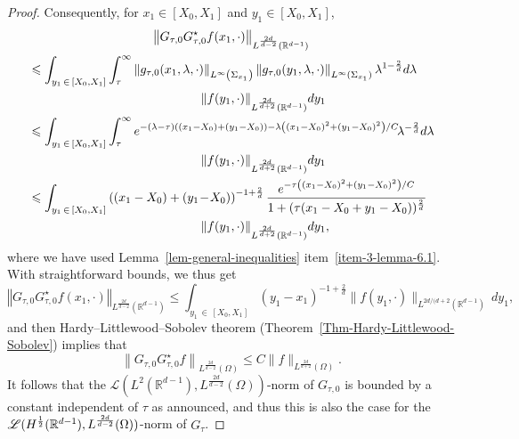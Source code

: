 \documentclass[AHL,Unicode,longabstracts]{cedram}
\newcommand{\scL}{\mathscr{L}}
\newcommand*\R{\mathbb{R}}
\newcommand{\norm}[1]{\left\Vert#1\right\Vert}
\renewcommand{\leq}{\leqslant}
\begin{document}
\begin{proof}
Consequently, for $x_1 \in [X_0, X_1]$ and $y_1 \in [X_0, X_1]$,
\begin{multline*}
\norm{G_{\tau,0} G_{\tau,0}^\star f(x_1, \cdot)
}_{L^{\frac{2d}{d-2}}\left(\R^{d-1}\right)}
\\
\begin{aligned}
&\leq
\int_{y_1\, \in\,[X_0, X_1]} \int_\tau^\infty \norm{ g_{\tau,0}(x_1,\lambda, \cdot)}_{L^\infty\left(\Sigma_{x_1}\right)} \norm{g_{\tau,0}(y_1,\lambda, \cdot)}_{L^\infty(\Sigma_{x_1})} \lambda^{1 - \frac{2}{d}} d \lambda\\
& \mkern250mu  \| f(y_1, \cdot) \|_{L^{\frac{2d}{d+2}}\left(\R^{d-1}\right)} dy_1
\\
& \leq
\int_{y_1\,\in\,[X_0, X_1]} 
\int_\tau^\infty  e^{-(\lambda - \tau)\left((x_1 - X_0)+(y_1-X_0)\right) - \lambda \left((x_1 - X_0)^2+(y_1-X_0)^2\right)/C}\!\lambda^{ - \frac{2}{d}} d \lambda \\
&\mkern250mu \| f(y_1, \cdot) \|_{L^{\frac{2d}{d+2}}\left(\R^{d-1}\right)}  dy_1
\\
& \leq 
\int_{y_1\, \in\,[X_0, X_1]}\left((x_1 -X_0) + (y_1\! -\!X_0) \right)^{-1+\frac{2}{d}} \frac{e^{-\tau \left((x_1 - X_0)^2+(y_1-X_0)^2\right)/C}}{1 + (\tau (x_1 -X_0 + y_1 -X_0))^{\frac{2}{d}}}\\
&\mkern250mu \| f(y_1, \cdot) \|_{L^{\frac{2d}{d+2}}\left(\R^{d-1}\right)} dy_1,
\end{aligned}
\end{multline*}
where we have used Lemma~\ref{lem-general-inequalities} item~\eqref{item-3-lemma-6.1}. With straightforward bounds, we thus get
\[
\norm{G_{\tau,0} G_{\tau,0}^\star f(x_1, \cdot)
}_{L^{\frac{2d}{d-2}}\left(\R^{d-1}\right)}
\leq
\int_{y_1\, \in\,[X_0, X_1]}\left(y_1 -x_1 \right)^{-1+\frac{2}{d}} \| f(y_1, \cdot) \|_{L^{2d/(d+2}\left(\R^{d-1}\right)} \, dy_1,
\]
and then Hardy--Littlewood--Sobolev theorem (Theorem~\ref{Thm-Hardy-Littlewood-Sobolev}) implies that
\begin{equation*}
\left\| G_{\tau,0} G_{\tau,0}^\star f
\right\|_{L^{\frac{2d}{d-2}}(\Omega)}
\leq C \| f \|_{L^{\frac{2d}{d+2}}(\Omega)}.
\end{equation*}
It follows that the $\scL(L^2(\R^{d-1}), L^{\frac{2d}{d-2}}(\Omega))$-norm of $G_{\tau,0}$ is bounded by a constant independent of $\tau$ as announced, and thus this is also the case for the $\scL(H^{\frac{1}{2}}(\R^{d-1}),\newline L^{\frac{2d}{d-2}}(\Omega))$-norm of $G_\tau$.
\end{proof}
\end{document}

